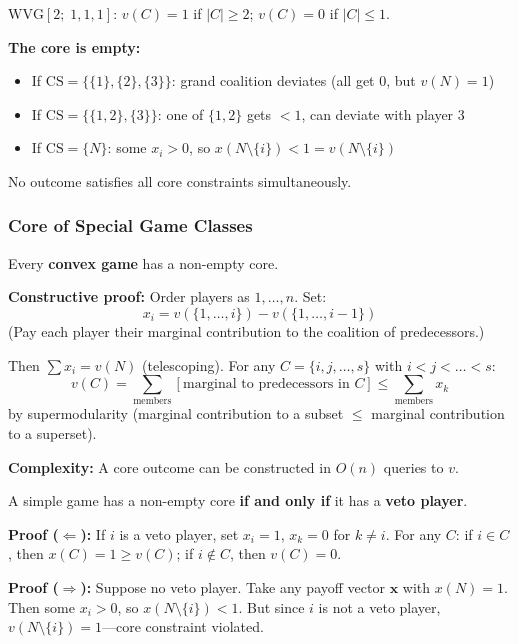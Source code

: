 \begin{exbox}
$\text{WVG}[2;\; 1, 1, 1]$: $v(C) = 1$ if $|C| \geq 2$; $v(C) = 0$ if $|C| \leq 1$.

\textbf{The core is empty:}
\begin{itemize}
  \item If $\text{CS} = \{\{1\},\{2\},\{3\}\}$: grand coalition deviates (all get 0, but $v(N) = 1$)
  \item If $\text{CS} = \{\{1,2\},\{3\}\}$: one of $\{1,2\}$ gets $< 1$, can deviate with player 3
  \item If $\text{CS} = \{N\}$: some $x_i > 0$, so $x(N \setminus \{i\}) < 1 = v(N \setminus \{i\})$
\end{itemize}

No outcome satisfies all core constraints simultaneously.
\end{exbox}

\separator

\subsubsection{Core of Special Game Classes}

\begin{thmbox}
Every \textbf{convex game} has a non-empty core.

\textbf{Constructive proof:} Order players as $1, \ldots, n$. Set:
\[
x_i = v(\{1, \ldots, i\}) - v(\{1, \ldots, i-1\})
\]
(Pay each player their marginal contribution to the coalition of predecessors.)

Then $\sum x_i = v(N)$ (telescoping). For any $C = \{i, j, \ldots, s\}$ with $i < j < \ldots < s$:
\[
v(C) = \sum_{\text{members}} [\text{marginal to predecessors in } C] \leq \sum_{\text{members}} x_k
\]
by supermodularity (marginal contribution to a subset $\leq$ marginal contribution to a superset).

\textbf{Complexity:} A core outcome can be constructed in $O(n)$ queries to $v$.
\end{thmbox}

\begin{thmbox}
A simple game has a non-empty core \textbf{if and only if} it has a \textbf{veto player}.

\textbf{Proof ($\Leftarrow$):} If $i$ is a veto player, set $x_i = 1$, $x_k = 0$ for $k \neq i$. For any $C$: if $i \in C$, then $x(C) = 1 \geq v(C)$; if $i \notin C$, then $v(C) = 0$.

\textbf{Proof ($\Rightarrow$):} Suppose no veto player. Take any payoff vector $\mathbf{x}$ with $x(N) = 1$. Then some $x_i > 0$, so $x(N \setminus \{i\}) < 1$. But since $i$ is not a veto player, $v(N \setminus \{i\}) = 1$---core constraint violated.
\end{thmbox}

